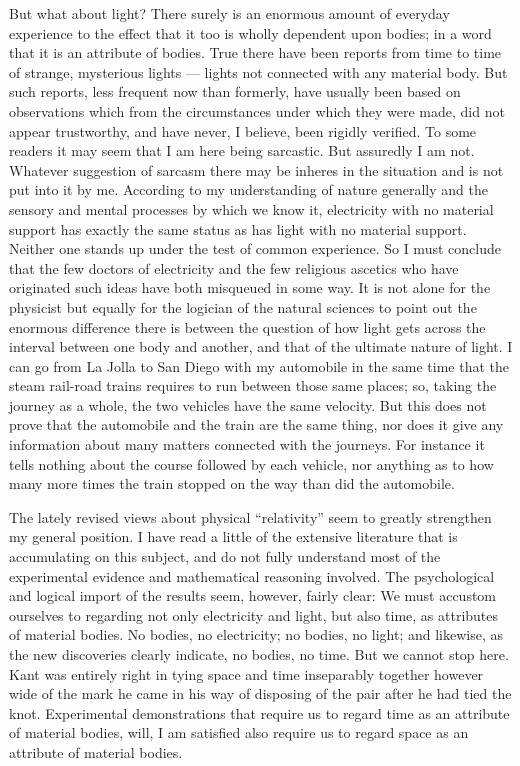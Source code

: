 \documentclass[a4paper, 11pt, oneside, polutonikogreek, english]{article}
\begin{document}
But what about light? There surely is an enormous amount of everyday experience to the effect that it too is wholly dependent upon bodies; in a word that it is an attribute of bodies. True there have been reports from time to time of strange, mysterious lights --- lights not connected with any material body. But such reports, less frequent now than formerly, have usually been based on observations which from the circumstances under which they were made, did not appear trustworthy, and have never, I believe, been rigidly verified. To some readers it may seem that I am here being sarcastic. But assuredly I am not. Whatever suggestion of sarcasm there may be inheres in the situation and is not put into it by me. According to my understanding of nature generally and the sensory and mental processes by which we know it, electricity with no material support has exactly the same status as has light with no material support. Neither one stands up under the test of common experience. So I must conclude that the few doctors of electricity and the few religious ascetics who have originated such ideas have both misqueued in some way. It is not alone for the physicist but equally for the logician of the natural sciences to point out the enormous difference there is between the question of how light gets across the interval between one body and another, and that of the ultimate nature of light. I can go from La Jolla to San Diego with my automobile in the same time that the steam rail-road trains requires to run between those same places; so, taking the journey as a whole, the two vehicles have the same velocity. But this does not prove that the automobile and the train are the same thing, nor does it give any information about many matters connected with the journeys. For instance it tells nothing about the course followed by each vehicle, nor anything as to how many more times the train stopped on the way than did the automobile.

The lately revised views about physical ``relativity'' seem to greatly strengthen my general position. I have read a little of the extensive literature that is accumulating on this subject, and do not fully understand most of the experimental evidence and mathematical reasoning involved. The psychological and logical import of the results seem, however, fairly clear: We must accustom ourselves to regarding not only electricity and light, but also time, as attributes of material bodies. No bodies, no electricity; no bodies, no light; and likewise, as the new discoveries clearly indicate, no bodies, no time. But we cannot stop here. Kant was entirely right in tying space and time inseparably together however wide of the mark he came in his way of disposing of the pair after he had tied the knot. Experimental demonstrations that require us to regard time as an attribute of material bodies, will, I am satisfied also require us to regard space as an attribute of material bodies.
\end{document}
